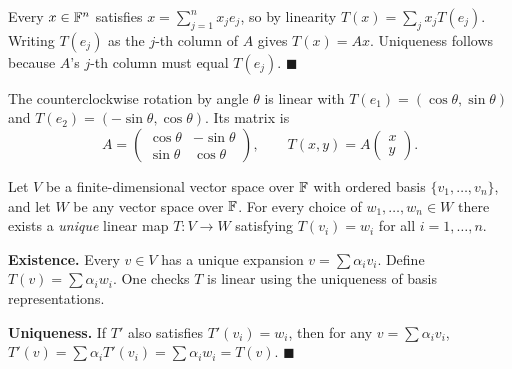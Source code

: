 \begin{proofbox}
Every $x\in\mathbb{F}^n$ satisfies $x=\sum_{j=1}^n x_j e_j$, so by linearity
$T(x)=\sum_j x_j T(e_j)$.  Writing $T(e_j)$ as the $j$-th column of $A$
gives $T(x)=Ax$.  Uniqueness follows because $A$'s $j$-th column must equal
$T(e_j)$.
\hfill$\blacksquare$
\end{proofbox}

\begin{exbox}
The counterclockwise rotation by angle $\theta$ is linear with
$T(e_1)=(\cos\theta,\sin\theta)$ and $T(e_2)=(-\sin\theta,\cos\theta)$.
Its matrix is
\[
    A = \begin{pmatrix} \cos\theta & -\sin\theta \\ \sin\theta & \cos\theta \end{pmatrix},
    \qquad T(x,y) = A\begin{pmatrix}x\\y\end{pmatrix}.
\]
\end{exbox}

\begin{thmbox}
\label{thm:unique-lt}
Let $V$ be a finite-dimensional vector space over $\mathbb{F}$ with ordered basis
$\{v_1,\ldots,v_n\}$, and let $W$ be any vector space over $\mathbb{F}$.  For every
choice of $w_1,\ldots,w_n\in W$ there exists a \emph{unique} linear map
$T:V\to W$ satisfying $T(v_i)=w_i$ for all $i=1,\ldots,n$.
\end{thmbox}

\begin{proofbox}
\textbf{Existence.}  Every $v\in V$ has a unique expansion
$v=\sum\alpha_i v_i$.  Define $T(v)=\sum\alpha_i w_i$.  One checks $T$ is
linear using the uniqueness of basis representations.

\textbf{Uniqueness.}  If $T'$ also satisfies $T'(v_i)=w_i$, then for any
$v=\sum\alpha_i v_i$, $T'(v)=\sum\alpha_i T'(v_i)=\sum\alpha_i w_i=T(v)$.
\hfill$\blacksquare$
\end{proofbox}

